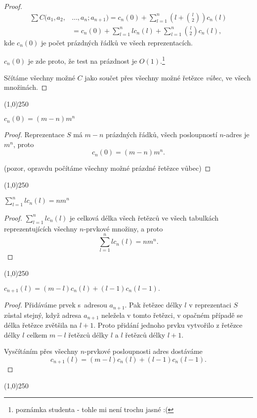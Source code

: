 \documentclass[a4paper,12pt]{article}
\newenvironment{myproof}{
  \begin{proof}
    
  }{
  \end{proof}
  \begin{center}
   \line(1,0){250}
   \end{center}
  }
\begin{document}
\begin{myproof}
\begin{align*}\sum C(a_1,a_2,&\dots,a_n;a_{n+1})=c_n(0)+\sum_{l=1}^n(l+\binom 
l2)c_n(l)\\
&=c_n(0)+\sum_{l=1}^nlc_n(l)+\sum_{l=1}^n\binom l2c_n(l),\end{align*}
kde $c_n(0)$ je počet prázdných řádků ve všech 
reprezentacích.

$c_n(0)$ je zde proto, že test na prázdnost je $O(1)$.\footnote{poznámka studenta - tohle mi není trochu jasné :(}

Sčítáme všechny možné $C$ jako součet přes všechny možné řetězce \emph{vůbec}, ve všech množinách.

\end{myproof}

\begin{lemma}
    $c_n(0)=(m-n)m^n$
\end{lemma}

\begin{myproof}
Reprezentace $S$ má $m-n$ prázdných řádků, 
všech posloupností $n$-adres je $m^n$, proto 
$$c_n(0)=(m-n)m^n.$$

(pozor, opravdu počítáme všechny možné prázdné řetězce vůbec)
\end{myproof}

\begin{lemma}
    $\sum_{l=1}^nlc_n(l)=nm^n$
\end{lemma}

\begin{myproof}

$\sum_{l=1}^nlc_n(l)$ je celková délka všech řetězců ve 
všech tabulkách reprezentujících všechny $n$-prvkové 
množiny, a proto 
$$\sum_{l=1}^nlc_n(l)=nm^n.$$
\end{myproof}
    
\begin{lemma}
   $c_{n+1}(l)=(m-l)c_n(l)+(l-1)c_n(l-1).$ 
\end{lemma}
\begin{myproof}
    Přidáváme prvek s~adresou $a_{n+1}$.  Pak řetězec 
    délky $l$ v reprezentaci $S$ zůstal stejný, když 
    adresa $a_{n+1}$ neležela v tomto řetězci, v opačném případě 
    se délka řetězce zvětšila na $l+1$.  Proto přidání jednoho 
    prvku vytvořilo z řetězce délky $l$ celkem $m-l$ 
    řetězců délky $l$ a $l$ řetězců délky $
    l+1$.  
    
    Vysčítáním přes všechny $n$-prvkové posloupnosti adres 
    dostáváme 
    $$c_{n+1}(l)=(m-l)c_n(l)+(l-1)c_n(l-1).$$
\end{myproof}
\end{document}
